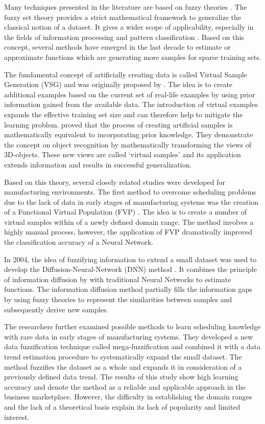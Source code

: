 \documentclass[parskip=full]{scrartcl}
\begin{document}
Many techniques presented in the literature are based on fuzzy theories
\cite{AbdulLateh.2017}. The fuzzy set theory provides a strict mathematical
framework to generalize the classical notion of a dataset. It gives a wider
scope of applicability, especially in the fields of information processing and
pattern classification \cite{Zimmermann.2010}. Based on this concept, several
methods have emerged in the last decade to estimate or approximate functions
which are generating more samples for sparse training sets.

The fundamental concept of artificially creating data is called Virtual Sample 
Generation (VSG) and was originally proposed by \cite{Niyogi.1998}. The idea is 
to create additional examples based on the current set of real-life examples by 
using prior information gained from the available data. The introduction of 
virtual examples expands the effective training set size and can therefore help 
to mitigate the learning problem. \cite{Niyogi.1998} proved that the process of 
creating artificial samples is mathematically equivalent to incorporating prior 
knowledge. They demonstrate the concept on object recognition by mathematically 
transforming the views of 3D-objects. These new views are called ‘virtual 
samples’ and its application extends information and results in successful 
generalization. 

Based on this theory, several closely related studies were developed for
manufacturing environments. The first method to overcome scheduling problems due
to the lack of data in early stages of manufacturing systems was the creation of
a Functional Virtual Population (FVP) \cite{Li.2003}. The idea is to
create a number of virtual samples within of a newly defined domain range. The
method involves a highly manual process, however, the application of FVP
dramatically improved the classification accuracy of a Neural Network. 

In 2004, the idea of fuzzifying information to extend a small dataset was used to develop the Diffusion-Neural-Network (DNN) method \cite{Huang.2004}. It combines the principle of information diffusion by \cite{Huang.1997} with traditional Neural Networks to estimate functions. The information diffusion method partially fills the information gaps by using fuzzy theories to represent the similarities between samples and subsequently derive new samples. 

The researchers \cite{Li.2006b} further examined possible methods to learn
scheduling knowledge with rare data in early stages of manufacturing systems.
They developed a new data fuzzification technique called mega-fuzzification and
combined it with a data trend estimation procedure to systematically expand the
small dataset. The method fuzzifies the dataset as a whole and expands it in
consideration of a previously defined data trend. The results of this study 
show high learning accuracy and denote the method as a reliable and applicable 
approach in the business marketplace. However, the difficulty in establishing 
the domain ranges and the lack of a theoretical basis explain its lack of 
popularity and limited interest. 
\end{document}
